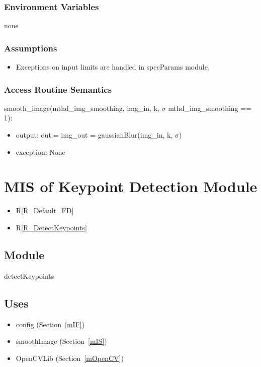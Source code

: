 \documentclass[12pt, titlepage]{article}
\begin{document}
\subsubsection{Environment Variables}
none

\subsubsection{Assumptions}
  \begin{itemize}
  \item Exceptions on input limits are handled in specParams module.
  \end{itemize}

\subsubsection{Access Routine Semantics}

\noindent smooth\_image(mthd\_img\_smoothing, img\_in, 
k, $\sigma$ \textbar \: mthd\_img\_smoothing == 1):
\begin{itemize}
\item output: out:= img\_out = gaussianBlur(img\_in, 
  k, $\sigma$)
\item exception: None
\end{itemize}




\section{MIS of Keypoint Detection Module} \label{mKD}
\begin{itemize}
  \item R\ref{R_Default_FD}
  \item R\ref{R_DetectKeypoints}
\end{itemize}

\subsection{Module}
detectKeypoints

\subsection{Uses}
\begin{itemize}
  \item config (Section~\ref{mIF})
  \item smoothImage (Section~\ref{mIS}) %
  \item OpenCVLib (Section~\ref{mOpenCV})
\end{itemize}
\end{document}
